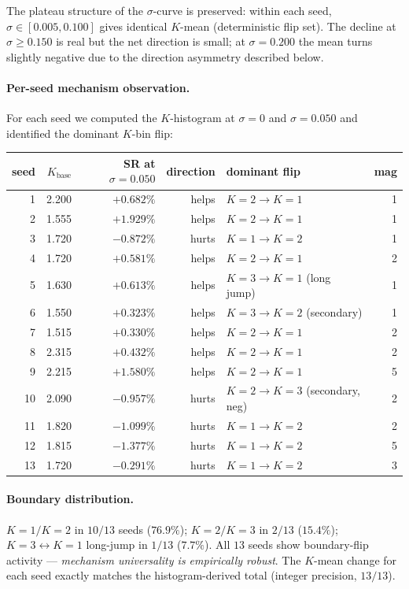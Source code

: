 \documentclass[11pt]{article}
\begin{document}
The plateau structure of the $\sigma$-curve is preserved: within each seed, $\sigma \in [0.005, 0.100]$ gives identical $K$-mean (deterministic flip set). The decline at $\sigma \geq 0.150$ is real but the net direction is small; at $\sigma = 0.200$ the mean turns slightly negative due to the direction asymmetry described below.

\paragraph{Per-seed mechanism observation.}
For each seed we computed the $K$-histogram at $\sigma = 0$ and $\sigma = 0.050$ and identified the dominant $K$-bin flip:

\begin{center}
\begin{tabular}{rrrrlr}
\toprule
seed & $K_{\text{base}}$ & SR at $\sigma{=}0.050$ & direction & dominant flip & mag \\
\midrule
1 & 2.200 & $+0.682\%$ & helps & $K{=}2 \to K{=}1$ & 1 \\
2 & 1.555 & $+1.929\%$ & helps & $K{=}2 \to K{=}1$ & 1 \\
3 & 1.720 & $-0.872\%$ & hurts & $K{=}1 \to K{=}2$ & 1 \\
4 & 1.720 & $+0.581\%$ & helps & $K{=}2 \to K{=}1$ & 2 \\
5 & 1.630 & $+0.613\%$ & helps & $K{=}3 \to K{=}1$ (long jump) & 1 \\
6 & 1.550 & $+0.323\%$ & helps & $K{=}3 \to K{=}2$ (secondary) & 1 \\
7 & 1.515 & $+0.330\%$ & helps & $K{=}2 \to K{=}1$ & 2 \\
8 & 2.315 & $+0.432\%$ & helps & $K{=}2 \to K{=}1$ & 2 \\
9 & 2.215 & $+1.580\%$ & helps & $K{=}2 \to K{=}1$ & 5 \\
10 & 2.090 & $-0.957\%$ & hurts & $K{=}2 \to K{=}3$ (secondary, neg) & 2 \\
11 & 1.820 & $-1.099\%$ & hurts & $K{=}1 \to K{=}2$ & 2 \\
12 & 1.815 & $-1.377\%$ & hurts & $K{=}1 \to K{=}2$ & 5 \\
13 & 1.720 & $-0.291\%$ & hurts & $K{=}1 \to K{=}2$ & 3 \\
\bottomrule
\end{tabular}
\end{center}

\paragraph{Boundary distribution.}
$K = 1 / K = 2$ in $10/13$ seeds ($76.9\%$); $K = 2 / K = 3$ in $2/13$ ($15.4\%$); $K = 3 \leftrightarrow K = 1$ long-jump in $1/13$ ($7.7\%$). All $13$ seeds show boundary-flip activity --- \emph{mechanism universality is empirically robust}. The $K$-mean change for each seed exactly matches the histogram-derived total (integer precision, $13/13$).
\end{document}
